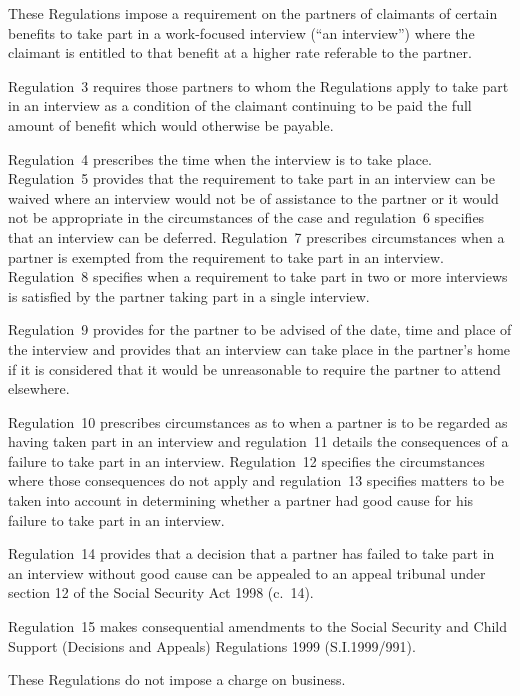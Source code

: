 \documentclass[12pt,a4paper]{article}
\begin{document}
These Regulations impose a requirement on the partners of claimants of certain benefits to take part in a work-focused interview (“an interview”) where the claimant is entitled to that benefit at a higher rate referable to the partner.

Regulation~3 requires those partners to whom the Regulations apply to take part in an interview as a condition of the claimant continuing to be paid the full amount of benefit which would otherwise be payable.

Regulation~4 prescribes the time when the interview is to take place. Regulation~5 provides that the requirement to take part in an interview can be waived where an interview would not be of assistance to the partner or it would not be appropriate in the circumstances of the case and regulation~6 specifies that an interview can be deferred. Regulation~7 prescribes circumstances when a partner is exempted from the requirement to take part in an interview. Regulation~8 specifies when a requirement to take part in two or more interviews is satisfied by the partner taking part in a single interview.

Regulation~9 provides for the partner to be advised of the date, time and place of the interview and provides that an interview can take place in the partner’s home if it is considered that it would be unreasonable to require the partner to attend elsewhere.

Regulation~10 prescribes circumstances as to when a partner is to be regarded as having taken part in an interview and regulation~11 details the consequences of a failure to take part in an interview. Regulation~12 specifies the circumstances where those consequences do not apply and regulation~13 specifies matters to be taken into account in determining whether a partner had good cause for his failure to take part in an interview.

Regulation~14 provides that a decision that a partner has failed to take part in an interview without good cause can be appealed to an appeal tribunal under section 12 of the Social Security Act 1998 (c.~14).

Regulation~15 makes consequential amendments to the Social Security and Child Support (Decisions and Appeals) Regulations 1999 (S.I.1999/991).

These Regulations do not impose a charge on business. 
\end{document}
